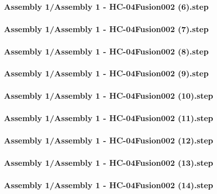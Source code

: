 \documentclass[a4paper,12pt]{article}
\begin{document}
\begin{lstlising}[language=C++]
\subsubsection{Assembly 1/Assembly 1 - HC-04Fusion002 (6).step}

\subsubsection{Assembly 1/Assembly 1 - HC-04Fusion002 (7).step}

\subsubsection{Assembly 1/Assembly 1 - HC-04Fusion002 (8).step}

\subsubsection{Assembly 1/Assembly 1 - HC-04Fusion002 (9).step}

\subsubsection{Assembly 1/Assembly 1 - HC-04Fusion002 (10).step}

\subsubsection{Assembly 1/Assembly 1 - HC-04Fusion002 (11).step}

\subsubsection{Assembly 1/Assembly 1 - HC-04Fusion002 (12).step}

\subsubsection{Assembly 1/Assembly 1 - HC-04Fusion002 (13).step}

\subsubsection{Assembly 1/Assembly 1 - HC-04Fusion002 (14).step}


\end{lstlising}
\end{document}
